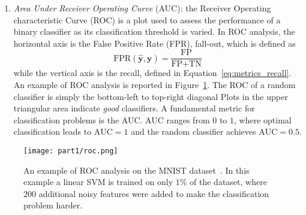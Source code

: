 \begin{enumerate}
\begin{enumerate}[label=(\roman*)]
    			\item \textit{Area Under Receiver Operating Curve} (\ac{AUC}): the Receiver Operating characteristic Curve (\ac{ROC}) is a plot used to assess the performance of a binary classifier as its classification threshold is varied. In ROC analysis, the horizontal axis is the False Positive Rate (\ac{FPR}), \aka fall-out, which is defined as
    			\begin{equation} \label{eq:metrics_fpr}
    			\text{FPR}(\bm{\hat y}, \bm{y}) = \frac{\text{FP}}{\text{FP} + \text{TN}}
    			\end{equation}
				while the vertical axis is the recall, defined in Equation~\eqref{eq:metrics_recall}. An example of ROC analysis is reported in Figure~\ref{fig:roc}. The ROC of a random classifier is simply the bottom-left to top-right diagonal Plots in the upper triangular area indicate \textit{good} classifiers. A fundamental metric for classification problems is the AUC. AUC ranges from $0$ to $1$, where optimal classification leads to $\text{AUC} = 1$ and the random classifier achieves $\text{AUC} = 0.5$.
    		\end{enumerate}
    	
        \begin{figure}[!h]
    		\centering
    		\texttt{[image: part1/roc.png]}
    		\caption{An example of ROC analysis on the MNIST dataset~\cite{lecun2010mnist}. In this example a linear SVM is trained on only $1\%$ of the dataset, where $200$ additional noisy features were added to make the classification problem harder.} \label{fig:roc}
    	\end{figure}


\end{enumerate}

